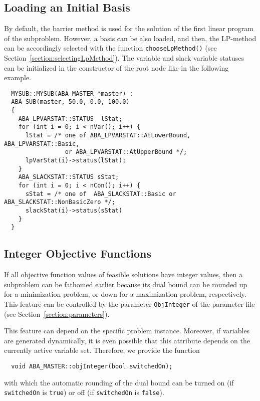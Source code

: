 \subsection{Loading an Initial Basis}
\noindent
By default, the barrier method is used for the solution of the first
linear program of the subproblem. However, a basis can be also loaded,
and then, the LP-method can be accordingly selected with the
function {\tt chooseLpMethod()} (see Section~\ref{section:selectingLpMethod}).
The variable and slack variable statuses can be initialized
in the constructor of the root node like in the following example.
\begin{verbatim}
  MYSUB::MYSUB(ABA_MASTER *master) : 
  ABA_SUB(master, 50.0, 0.0, 100.0)
  { 
    ABA_LPVARSTAT::STATUS  lStat;
    for (int i = 0; i < nVar(); i++) {
      lStat = /* one of ABA_LPVARSTAT::AtLowerBound, ABA_LPVARSTAT::Basic, 
                 or ABA_LPVARSTAT::AtUpperBound */; 
      lpVarStat(i)->status(lStat);
    }
    ABA_SLACKSTAT::STATUS sStat;
    for (int i = 0; i < nCon(); i++) {
      sStat = /* one of  ABA_SLACKSTAT::Basic or ABA_SLACKSTAT::NonBasicZero */;
      slackStat(i)->status(sStat)
    }
  }
\end{verbatim}


\subsection{Integer Objective Functions}
\noindent
If all objective function values of feasible solutions have
integer values, then a subproblem can be fathomed earlier because
its dual bound can be rounded up for a minimization problem, or down
for a maximization problem, respectively. This feature
can be controlled by the parameter 
{\tt ObjInteger} of the parameter
file (see Section~\ref{section:parameters}). 

This feature can depend on the specific problem instance. Moreover,
if variables are generated dynamically, it is even possible that
this attribute depends on the currently active variable set.
Therefore, we provide the function
\begin{verbatim}
  void ABA_MASTER::objInteger(bool switchedOn);
\end{verbatim}
\noindent
with which the automatic rounding of the dual bound can be turned on
(if {\tt switchedOn} is {\tt true}) or off (if {\tt switchedOn} is {\tt false}).


